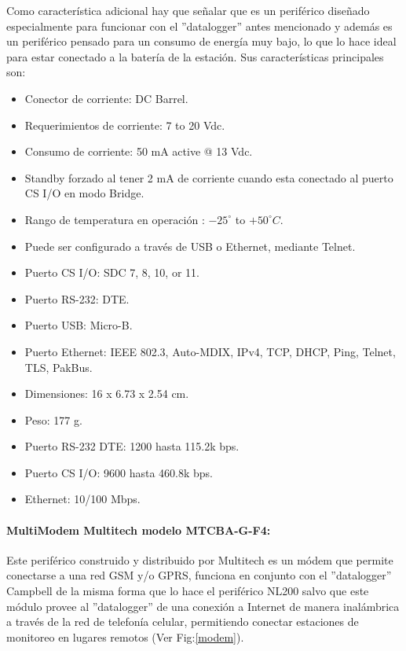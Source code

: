Como característica adicional hay que señalar que es un periférico diseñado especialmente para funcionar con el ''datalogger'' antes mencionado y además es un periférico pensado para un consumo de energía muy bajo, lo que lo hace ideal para estar conectado a la batería de la estación. Sus características principales son:

\begin{itemize}
\item Conector de corriente: DC Barrel.
\item Requerimientos de corriente: 7 to 20 Vdc. 
\item Consumo de corriente: 50 mA active @ 13 Vdc.
\item Standby forzado al tener 2 mA de corriente cuando esta conectado al puerto CS I/O en modo Bridge.
\item Rango de temperatura en operación : ${-25}^{\circ}$ to ${+50}^{\circ}C$.
\item Puede ser configurado a través de USB o Ethernet, mediante Telnet.
\item Puerto CS I/O: SDC 7, 8, 10, or 11.
\item Puerto RS-232: DTE.
\item Puerto USB: Micro-B.
\item Puerto Ethernet: IEEE 802.3, Auto-MDIX, IPv4, TCP, DHCP, Ping, Telnet, TLS, PakBus.
\item Dimensiones: 16 x 6.73 x 2.54 cm.
\item Peso: 177 g.
\item Puerto RS-232 DTE: 1200 hasta 115.2k bps.
\item Puerto CS I/O: 9600 hasta 460.8k bps.
\item Ethernet: 10/100 Mbps.
\end{itemize}

\paragraph{MultiModem Multitech modelo MTCBA-G-F4:}
Este periférico construido y distribuido por Multitech\cite{hardware:multitech} es un módem que permite conectarse a una red GSM y/o GPRS, funciona en conjunto con el ''datalogger'' Campbell de la misma forma que lo hace el periférico NL200 salvo que este módulo provee al ''datalogger'' de una conexión a Internet de manera inalámbrica a través de la red de telefonía celular, permitiendo conectar estaciones de monitoreo en lugares remotos (Ver Fig:\ref{modem}).\\

